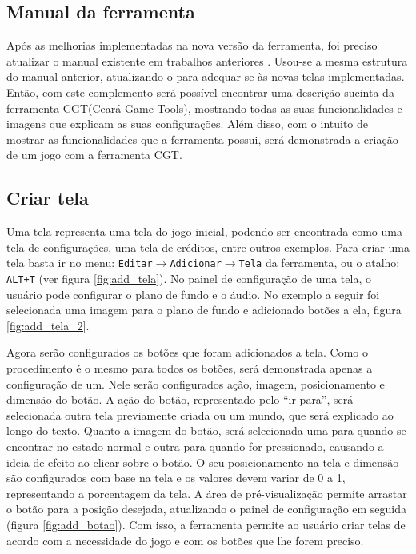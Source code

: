 \documentclass[12pt,oneside,openright,a4paper,english,brazil,sumario=tradicional]{abntex2}
\begin{document}
\begin{anexosenv}
   \partanexos
   \chapter{Manual da ferramenta}

   Após as melhorias implementadas na nova versão da ferramenta, foi preciso atualizar o manual existente em trabalhos anteriores \cite{monografia:aquino}. Usou-se a mesma estrutura do manual anterior, atualizando-o para adequar-se às novas telas implementadas.
   Então, com este complemento será possível encontrar uma descrição sucinta da ferramenta CGT(Ceará Game Tools), mostrando todas as suas funcionalidades e imagens que explicam as suas configurações.
   Além disso, com o intuito de mostrar as funcionalidades que a ferramenta possui, será demonstrada a criação de um jogo com a ferramenta CGT.

   \section{Criar tela}
   Uma tela representa uma tela do jogo inicial, podendo ser encontrada como uma tela de configurações, uma tela de créditos, entre outros exemplos.
   Para criar uma tela basta ir no menu: \texttt{Editar$\rightarrow$Adicionar$\rightarrow$Tela} da ferramenta, ou o atalho: \texttt{ALT+T} (ver figura \ref{fig:add_tela}).
   No painel de configuração de uma tela, o usuário pode configurar o plano de fundo e o áudio.
   No exemplo a seguir foi selecionada uma imagem para o plano de fundo e adicionado botões a ela, figura \ref{fig:add_tela_2}.

   Agora serão configurados os botões que foram adicionados a tela.
   Como o procedimento é o mesmo para todos os botões, será demonstrada apenas a configuração de um. Nele serão configurados ação, imagem, posicionamento e dimensão do botão.
   A ação do botão, representado pelo “ir para”, será selecionada outra tela previamente criada ou um mundo, que será explicado ao longo do texto.
   Quanto a imagem do botão, será selecionada uma para quando se encontrar no estado normal e outra para quando for pressionado, causando a ideia de efeito ao clicar sobre o botão.
   O seu posicionamento na tela e dimensão são configurados com base na tela e os valores devem variar de 0 a 1, representando a porcentagem da tela. A área de pré-visualização permite arrastar o botão para a posição desejada, atualizando o painel de configuração em seguida (figura \ref{fig:add_botao}).
   Com isso, a ferramenta permite ao usuário criar telas de acordo com a necessidade do jogo e com os botões que lhe forem preciso.


\end{anexosenv}
\end{document}
